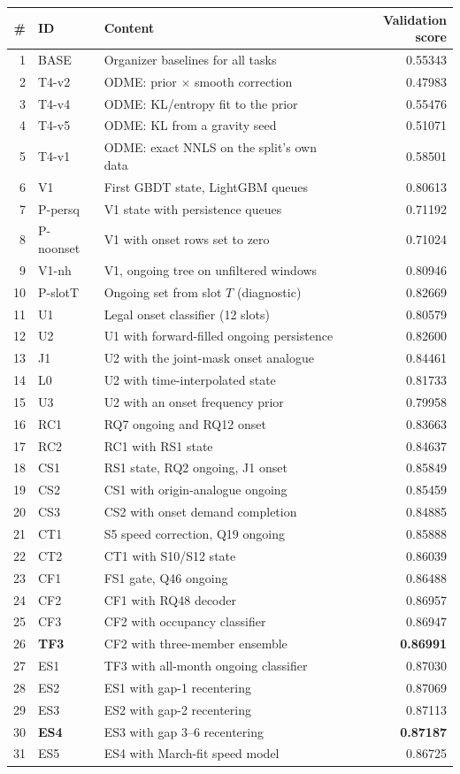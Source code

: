 \begin{tabular}{@{}r l l r@{}}
\toprule
\# & ID & Content & Validation score \\
\midrule
1 & BASE & Organizer baselines for all tasks & 0.55343 \\
2 & T4-v2 & ODME: prior $\times$ smooth correction & 0.47983 \\
3 & T4-v4 & ODME: KL/entropy fit to the prior & 0.55476 \\
4 & T4-v5 & ODME: KL from a gravity seed & 0.51071 \\
5 & T4-v1 & ODME: exact NNLS on the split's own data & 0.58501 \\
6 & V1 & First GBDT state, LightGBM queues & 0.80613 \\
7 & P-persq & V1 state with persistence queues & 0.71192 \\
8 & P-noonset & V1 with onset rows set to zero & 0.71024 \\
9 & V1-nh & V1, ongoing tree on unfiltered windows & 0.80946 \\
10 & P-slotT & Ongoing set from slot $T$ (diagnostic) & 0.82669 \\
11 & U1 & Legal onset classifier (12 slots) & 0.80579 \\
12 & U2 & U1 with forward-filled ongoing persistence & 0.82600 \\
13 & J1 & U2 with the joint-mask onset analogue & 0.84461 \\
14 & L0 & U2 with time-interpolated state & 0.81733 \\
15 & U3 & U2 with an onset frequency prior & 0.79958 \\
16 & RC1 & RQ7 ongoing and RQ12 onset & 0.83663 \\
17 & RC2 & RC1 with RS1 state & 0.84637 \\
18 & CS1 & RS1 state, RQ2 ongoing, J1 onset & 0.85849 \\
19 & CS2 & CS1 with origin-analogue ongoing & 0.85459 \\
20 & CS3 & CS2 with onset demand completion & 0.84885 \\
21 & CT1 & S5 speed correction, Q19 ongoing & 0.85888 \\
22 & CT2 & CT1 with S10/S12 state & 0.86039 \\
23 & CF1 & FS1 gate, Q46 ongoing & 0.86488 \\
24 & CF2 & CF1 with RQ48 decoder & 0.86957 \\
25 & CF3 & CF2 with occupancy classifier & 0.86947 \\
26 & \textbf{TF3} & CF2 with three-member ensemble & \textbf{0.86991} \\
27 & ES1 & TF3 with all-month ongoing classifier & 0.87030 \\
28 & ES2 & ES1 with gap-1 recentering & 0.87069 \\
29 & ES3 & ES2 with gap-2 recentering & 0.87113 \\
30 & \textbf{ES4} & ES3 with gap 3--6 recentering & \textbf{0.87187} \\
31 & ES5 & ES4 with March-fit speed model & 0.86725 \\
\bottomrule
\end{tabular}
